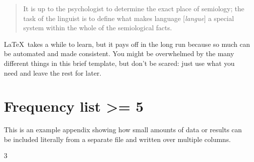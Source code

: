 \documentclass[a4paper,12pt]{article}
\begin{document}
\begin{quote}
    It is up to the psychologist to determine the exact place of semiology; the task of the linguist is to define what makes language [\textit{langue}] a special system within the whole of the semiological facts. \parencite[p. 33; my translation]{Saussure16}
\end{quote}

\LaTeX\ takes a while to learn, but it pays off in the long run because so much can be automated and made consistent.
You might be overwhelmed by the many different things in this brief template, but don't be scared: just use what you need and leave the rest for later.

\printbibliography

\clearpage
\appendix
\section{Frequency list >= 5} \label{app:freq}
This is an example appendix showing how small amounts of data or results  can be included literally from a separate file and written over multiple columns.

\begin{multicols}{3}
{\footnotesize}
\end{multicols}
\end{document}
